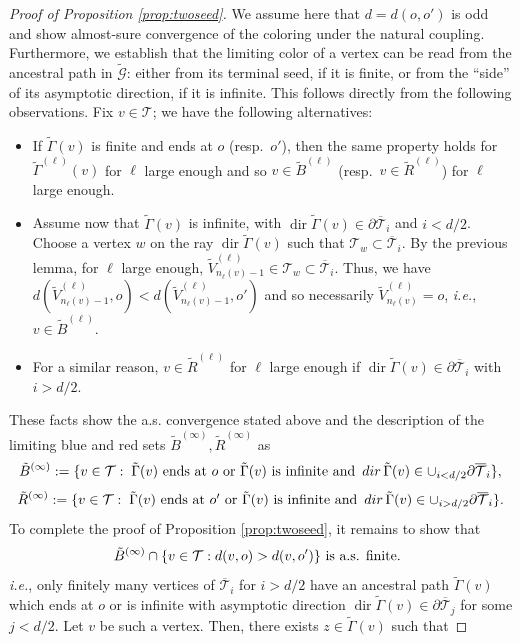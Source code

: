\documentclass[french]{article}
\newcommand{\T}{\mathcal{T}}
\renewcommand{\dir}{\mathop{dir}}
\renewcommand{\1}{\mathds{1}}
\begin{document}
\begin{proof}[Proof of Proposition \ref{prop:twoseed}]
We assume here that $d=d(o,o')$ is odd and show almost-sure convergence of the coloring under the natural coupling. Furthermore, we establish that the limiting color of a vertex can be read from the ancestral path in $\tilde{\mathcal G}$: either from its terminal seed, if it is finite, or from the ``side'' of its asymptotic direction, if it is infinite. 
This follows directly from the following observations. Fix $v\in \T$; we have the following alternatives:
\begin{itemize}
    \item If $\tilde{\Gamma}(v)$ is finite and ends at $o$ (resp.\ $o'$), then the same property holds for $\tilde{\Gamma}^{(\ell)}(v)$ for $\ell$ large enough and so $v\in \tilde{B}^{(\ell)}$ (resp.\ $v\in \tilde{R}^{(\ell)}$) for $\ell$ large enough.
    \item Assume now that $\tilde{\Gamma}(v)$ is infinite, with $\dir\tilde{\Gamma}(v) \in \partial \overline{\T}_i$ and $i<d/2$. Choose a vertex $w$ on the ray $\dir\tilde{\Gamma}(v)$ such that $\T_w\subset \overline{\T}_i$. By the previous lemma, for $\ell$ large enough, $\tilde{V}^{(\ell)}_{n_\ell(v)-1}\in \T_w\subset \overline{\T}_i$. Thus, we have $d(\tilde{V}^{(\ell)}_{n_\ell(v)-1},o)<d(\tilde{V}^{(\ell)}_{n_\ell(v)-1},o')$ and so necessarily $\tilde{V}^{(\ell)}_{n_\ell(v)}=o$, \emph{i.e.}, $v\in \tilde{B}^{(\ell)}$.
    \item For a similar reason, $v\in \tilde{R}^{(\ell)}$ for $\ell$ large enough if $\dir\tilde{\Gamma}(v) \in \partial \overline{\T}_i$ with $i>d/2$.
\end{itemize}
These facts show the a.s. convergence stated above and the description of the limiting blue and red sets $\tilde{B}^{(\infty)}, \tilde{R}^{(\infty)}$ as
$$\tilde{B}^{(\infty)}:=\{v\in \T:\; \tilde{\Gamma}(v) \hbox{ ends at $o$  or } \tilde{\Gamma}(v) \hbox{ is infinite and }\dir \tilde{\Gamma}(v)\in \cup_{i<d/2} \partial\overline{\T}_i\}, $$
$$\tilde{R}^{(\infty)}:=\{v\in \T:\; \tilde{\Gamma}(v) \hbox{ ends at $o'$  or } \tilde{\Gamma}(v) \hbox{ is infinite and }\dir \tilde{\Gamma}(v)\in \cup_{i>d/2} \partial\overline{\T}_i\}. $$
To complete the proof of Proposition \ref{prop:twoseed}, it remains to show that 
 $$\tilde{B}^{(\infty)} \cap \{v \in \T : d(v,o)>d(v,o')\}\hbox{ is a.s. finite. }$$ 
 \emph{i.e.}, only finitely many vertices of $\overline{\T}_i$ for $i>d/2$ have an ancestral path $\tilde{\Gamma}(v)$ which ends at $o$ or is infinite with asymptotic direction $\dir \tilde{\Gamma}(v)\in \partial \overline{\T}_j$ for some $j<d/2$. Let $v$ be such a vertex. Then, there exists $z\in \tilde{\Gamma}(v)$ such that 

\end{proof}
\end{document}
